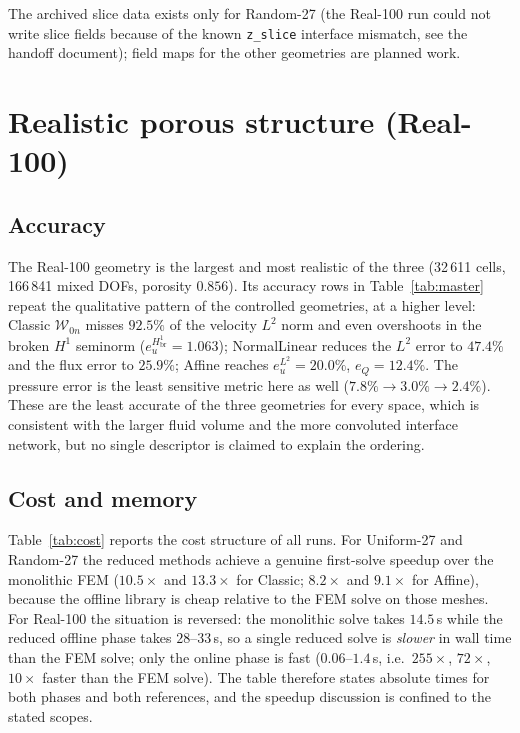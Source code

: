 \documentclass[11pt,a4paper]{article}
\newcommand{\Wspace}{\mathcal{W}}
\begin{document}
The archived slice data exists only for Random-27 (the Real-100 run
could not write slice fields because of the known
\texttt{z\_slice} interface mismatch, see the handoff document); field
maps for the other geometries are planned work.

\section{Realistic porous structure (Real-100)}
\label{sec:realistic}

\subsection{Accuracy}
\label{sec:realacc}

The Real-100 geometry is the largest and most realistic of the three
(32\,611 cells, 166\,841 mixed DOFs, porosity $0.856$).  Its accuracy
rows in Table~\ref{tab:master} repeat the qualitative pattern of the
controlled geometries, at a higher level: Classic $\Wspace_{0n}$
misses $92.5\%$ of the velocity $L^2$ norm and even overshoots in the
broken $H^1$ seminorm ($e_u^{H^1_{\mathrm{br}}} = 1.063$); NormalLinear
reduces the $L^2$ error to $47.4\%$ and the flux error to $25.9\%$;
Affine reaches $e_u^{L^2}=20.0\%$, $e_Q=12.4\%$.  The pressure error is
the least sensitive metric here as well ($7.8\%\to3.0\%\to2.4\%$).
These are the least accurate of the three geometries for every space,
which is consistent with the larger fluid volume and the more
convoluted interface network, but no single descriptor is claimed to
explain the ordering.

\subsection{Cost and memory}
\label{sec:realcost}

Table~\ref{tab:cost} reports the cost structure of all runs.  For
Uniform-27 and Random-27 the reduced methods achieve a genuine
first-solve speedup over the monolithic FEM ($10.5\times$ and $13.3\times$
for Classic; $8.2\times$ and $9.1\times$ for Affine), because the
offline library is cheap relative to the FEM solve on those meshes.
For Real-100 the situation is reversed: the monolithic solve takes
$14.5\,$s while the reduced offline phase takes $28$--$33\,$s, so a
single reduced solve is \emph{slower} in wall time than the FEM solve;
only the online phase is fast ($0.06$--$1.4\,$s, i.e.\ $255\times$,
$72\times$, $10\times$ faster than the FEM solve).  The table therefore
states absolute times for both phases and both references, and the
speedup discussion is confined to the stated scopes.
\end{document}

